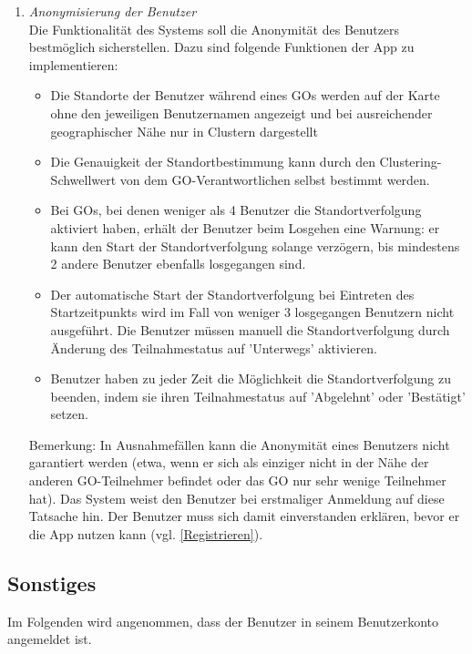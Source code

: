 \documentclass[parskip=full]{scrartcl}
\def\threedigits#1{%
  \ifnum#1<100 0\fi
  \ifnum#1<10 0\fi
  \number#1}
\begin{document}
\begin{enumerate}[label={\textbf{/F\protect\threedigits{\theenumi}0/}}, leftmargin=*, resume]
\item \textit{Anonymisierung der Benutzer}\label{Anonymisierung} \\ Die Funktionalität des Systems soll die Anonymität des Benutzers bestmöglich sicherstellen. Dazu sind folgende Funktionen der App zu implementieren:
		\begin{itemize}
			\item Die Standorte der Benutzer während eines GOs werden auf der Karte ohne den jeweiligen Benutzernamen angezeigt und bei ausreichender geographischer Nähe nur in Clustern dargestellt
			\item \colorbox{shadecolor}{\parbox{0.85\textwidth}{Die Genauigkeit der Standortbestimmung kann durch den Clustering-Schwellwert von dem GO-Verantwortlichen selbst bestimmt werden.}}
			\item \colorbox{shadecolor}{\parbox{.85\textwidth}{Bei GOs, bei denen weniger als 4 Benutzer die Standortverfolgung aktiviert haben, erhält der Benutzer beim Losgehen eine Warnung: er kann den Start der Standortverfolgung solange verzögern, bis mindestens 2 andere Benutzer ebenfalls losgegangen sind.}}
			\item Der automatische Start der Standortverfolgung bei Eintreten des Startzeitpunkts wird im Fall von weniger 3 losgegangen Benutzern nicht ausgeführt. Die Benutzer müssen manuell die Standortverfolgung durch Änderung des Teilnahmestatus auf 'Unterwegs' aktivieren.
			\item Benutzer haben zu jeder Zeit die Möglichkeit die Standortverfolgung zu beenden, indem sie ihren Teilnahmestatus auf 'Abgelehnt' oder 'Bestätigt' setzen.
		\end{itemize}
		Bemerkung: In Ausnahmefällen kann die Anonymität eines Benutzers nicht garantiert werden (etwa, wenn er sich als einziger nicht in der Nähe der anderen GO-Teilnehmer befindet oder das GO nur sehr wenige Teilnehmer hat). Das System weist den Benutzer bei erstmaliger Anmeldung auf diese Tatsache hin. Der Benutzer muss sich damit einverstanden erklären, bevor er die App nutzen kann (vgl. \ref{Registrieren}).
		
\end{enumerate}

\subsection{Sonstiges}
Im Folgenden wird angenommen, dass der Benutzer in seinem Benutzerkonto angemeldet ist.
\end{document}
